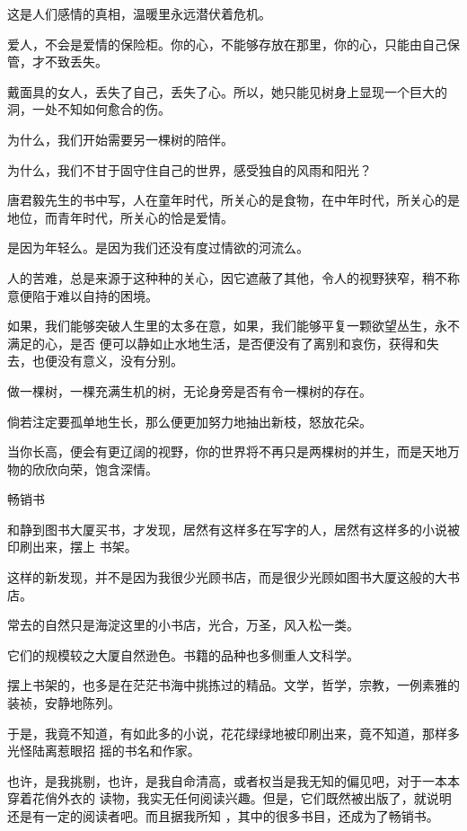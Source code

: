 \documentclass[12pt,a4paper]{article}
\newcommand{\subpart}[1]{
	\begingroup \par
	\vspace{1ex} \centering #1
	\par \endgroup
}
\begin{document}
		这是人们感情的真相，温暖里永远潜伏着危机。\par
		爱人，不会是爱情的保险柜。你的心，不能够存放在那里，你的心，只能由自己保管，才不致丢失。\par
		戴面具的女人，丢失了自己，丢失了心。所以，她只能见树身上显现一个巨大的洞，一处不知如何愈合的伤。

		为什么，我们开始需要另一棵树的陪伴。\par
		为什么，我们不甘于固守住自己的世界，感受独自的风雨和阳光？\par
		唐君毅先生的书中写，人在童年时代，所关心的是食物，在中年时代，所关心的是地位，而青年时代，所关心的恰是爱情。\par
		是因为年轻么。是因为我们还没有度过情欲的河流么。\par
		人的苦难，总是来源于这种种的关心，因它遮蔽了其他，令人的视野狭窄，稍不称意便陷于难以自持的困境。

		如果，我们能够突破人生里的太多在意，如果，我们能够平复一颗欲望丛生，永不满足的心，是否
	便可以静如止水地生活，是否便没有了离别和哀伤，获得和失去，也便没有意义，没有分别。

		做一棵树，一棵充满生机的树，无论身旁是否有令一棵树的存在。\par
		倘若注定要孤单地生长，那么便更加努力地抽出新枝，怒放花朵。\par
		当你长高，便会有更辽阔的视野，你的世界将不再只是两棵树的并生，而是天地万物的欣欣向荣，饱含深情。

	\endwriting



		\subpart{畅销书}

		和静到图书大厦买书，才发现，居然有这样多在写字的人，居然有这样多的小说被印刷出来，摆上
	书架。\par
		这样的新发现，并不是因为我很少光顾书店，而是很少光顾如图书大厦这般的大书店。

		常去的自然只是海淀这里的小书店，光合，万圣，风入松一类。\par
		它们的规模较之大厦自然逊色。书籍的品种也多侧重人文科学。\par
		摆上书架的，也多是在茫茫书海中挑拣过的精品。文学，哲学，宗教，一例素雅的装祯，安静地陈列。

		于是，我竟不知道，有如此多的小说，花花绿绿地被印刷出来，竟不知道，那样多光怪陆离惹眼招
	摇的书名和作家。

		也许，是我挑剔，也许，是我自命清高，或者权当是我无知的偏见吧，对于一本本穿着花俏外衣的
	读物，我实无任何阅读兴趣。但是，它们既然被出版了，就说明还是有一定的阅读者吧。而且据我所知
	，其中的很多书目，还成为了畅销书。
\end{document}
